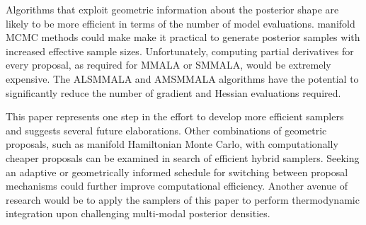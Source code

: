 \documentclass[twoside,11pt]{article}
\begin{document}
Algorithms that exploit geometric information about the posterior shape are likely to be more efficient in terms of the 
number of model evaluations. manifold MCMC methods could make make it practical to generate posterior samples with increased 
effective sample sizes. Unfortunately, computing partial derivatives for every proposal, as required for MMALA or SMMALA, 
would be extremely expensive. The ALSMMALA and AMSMMALA algorithms have the potential to significantly reduce the number of 
gradient and Hessian evaluations required.  

This paper represents one step in the effort to develop more efficient samplers and suggests several future elaborations.  
Other combinations of geometric proposals, such as manifold Hamiltonian Monte Carlo, with computationally cheaper proposals 
can be examined in search of efficient hybrid samplers. Seeking an adaptive or geometrically informed schedule for switching 
between proposal mechanisms could further improve computational efficiency. Another avenue of research would be to apply the 
samplers of this paper to perform thermodynamic integration upon challenging multi-modal posterior densities.   




\newpage

\vskip 0.2in

\end{document}

